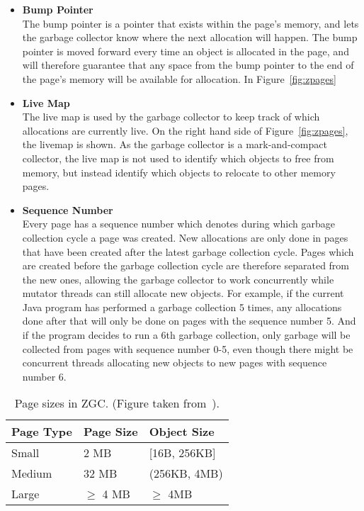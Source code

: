 \begin{itemize}
    \item {\textbf{Bump Pointer}} \\
          The bump pointer is a pointer that exists within the page's memory, and lets the garbage collector know where the next allocation will happen. The bump pointer is moved forward every time an object is allocated in the page, and will therefore guarantee that any space from the bump pointer to the end of the page's memory will be available for allocation. In Figure~\ref*{fig:zpages}
    \item {\textbf{Live Map}} \\ 
          The live map is used by the garbage collector to keep track of which allocations are currently live. On the right hand side of Figure~\ref*{fig:zpages}, the livemap is shown. As the garbage collector is a mark-and-compact collector, the live map is not used to identify which objects to free from memory, but instead identify which objects to relocate to other memory pages.
    \item {\textbf{Sequence Number}} \\
          Every page has a sequence number which denotes during which garbage collection cycle a page was created. New allocations are only done in pages that have been created after the latest garbage collection cycle. Pages which are created before the garbage collection cycle are therefore separated from the new ones, allowing the garbage collector to work concurrently while mutator threads can still allocate new objects. For example, if the current Java program has performed a garbage collection 5 times, any allocations done after that will only be done on pages with the sequence number 5. And if the program decides to run a 6th garbage collection, only garbage will be collected from pages with sequence number 0-5, even though there might be concurrent threads allocating new objects to new pages with sequence number 6.
\end{itemize}

\begin{table}[H]
\centering
\begin{tabular}{lllll}
\hline
Page Type & Page Size          & \multicolumn{3}{l}{Object Size}        \\ \hline
Small     & 2 MB                & \multicolumn{3}{l}{{[}16B, 256KB{]}}   \\
Medium    & 32 MB               & \multicolumn{3}{l}{(256KB, 4MB)}       \\
Large     & $\geq$ 4 MB & \multicolumn{3}{l}{$\geq$ 4MB} \\ \hline
\end{tabular}
\caption{Page sizes in ZGC. (Figure taken from~\cite{zpage_size_table}). }
\label{table:zpage_sizes}
\end{table}

